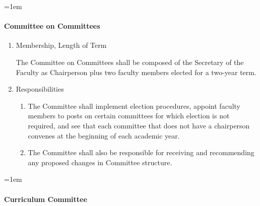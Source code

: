 \documentclass{manual}
\let\oldparagraph\paragraph
\renewcommand\paragraph{\leftskip=1em\oldparagraph}
\newcommand{\itemLevelA}{\alph*.}
\newcommand{\itemLevelB}{\arabic*)}
\newcommand{\itemRefA}{\alph*}
\newcommand{\itemRefB}{\arabic*}
\begin{document}
\begin{enumerate}[label=\itemLevelA,ref=\itemRefA]
\begin{enumerate}[label=\itemLevelB,ref=\itemRefB]
\end{enumerate}
\end{enumerate}

\paragraph{Committee on Committees}

\begin{enumerate}[label=\itemLevelA,ref=\itemRefA]
\item Membership, Length of Term

The Committee on Committees shall be composed of the Secretary of the Faculty as Chairperson plus two faculty members elected for a two-year term.
\item Responsibilities
\begin{enumerate}[label=\itemLevelB,ref=\itemRefB]
\item The Committee shall implement election procedures, appoint faculty members to posts on certain committees for which election is not required, and see that each committee that does not have a chairperson convenes at the beginning of each academic year.
\item The Committee shall also be responsible for receiving and recommending any proposed changes in Committee structure.

\end{enumerate}
\end{enumerate}

\paragraph{Curriculum Committee}
\end{document}

